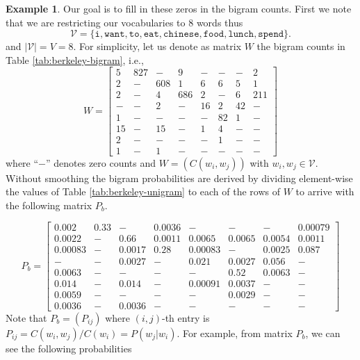\documentclass[
  12pt,
  a4paper]{article}
\theoremstyle{definition}
\theoremstyle{definition}
\newtheorem{example}{Example}[section]
\theoremstyle{definition}
\theoremstyle{definition}
\theoremstyle{remark}
\begin{document}
\begin{example}
Our goal is to fill in these zeros in the bigram counts. First we note that we are restricting our vocabularies to 8 words thus
\[
\mathcal{V}= \{\texttt{i},\texttt{want},\texttt{to},\texttt{eat},\texttt{chinese},\texttt{food},\texttt{lunch},\texttt{spend}\}.
\]
and \(|\mathcal{V}| = V = 8\). For simplicity, let us denote as matrix \(W\) the bigram counts in Table \ref{tab:berkeley-bigram}, i.e.,
\[
W = 
\begin{bmatrix}
       5 & 827 & - &   9 & - & - & - &   2 \\ 
    2 & - & 608 &   1 &   6 &   6 &   5 &   1 \\ 
    2 & - &   4 & 686 &   2 & - &   6 & 211 \\ 
  - & - &   2 & - &  16 &   2 &  42 & - \\ 
    1 & - & - & - & - &  82 &   1 & - \\ 
   15 & - &  15 & - &   1 &   4 & - & - \\ 
    2 & - & - & - & - &   1 & - & - \\ 
    1 & - &   1 & - & - & - & - & - 
\end{bmatrix}
\]
where ``\(-\)'' denotes zero counts and \(W = (C(w_i,w_j))\) with \(w_i,w_j \in \mathcal{V}\). Without smoothing the bigram probabilities are derived by dividing element-wise the values of Table \ref{tab:berkeley-unigram} to each of the rows of \(W\) to arrive with the following matrix \(P_b\).

\[
P_b =
\begin{bmatrix}
0.002 & 0.33 & - & 0.0036 & - & - & - & 0.00079 \\ 
  0.0022 & - & 0.66 & 0.0011 & 0.0065 & 0.0065 & 0.0054 & 0.0011 \\ 
  0.00083 & - & 0.0017 & 0.28 & 0.00083 & - & 0.0025 & 0.087 \\ 
  - & - & 0.0027 & - & 0.021 & 0.0027 & 0.056 & - \\ 
  0.0063 & - & - & - & - & 0.52 & 0.0063 & - \\ 
  0.014 & - & 0.014 & - & 0.00091 & 0.0037 & - & - \\ 
  0.0059 & - & - & - & - & 0.0029 & - & - \\ 
  0.0036 & - & 0.0036 & - & - & - & - & - 
\end{bmatrix}
\]
Note that \(P_b = (P_{ij})\) where \((i,j)\)-th entry is \(P_{ij} = C(w_i,w_j)/C(w_i)= P(w_j|w_i)\). For example, from matrix \(P_b\), we can see the following probabilities


\end{example}
\end{document}
